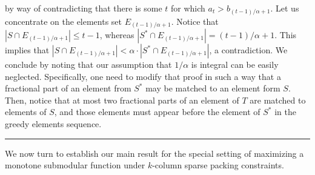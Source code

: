 \documentclass[11pt]{article}
\theoremstyle{plain}
\theoremstyle{definition}
\newcommand{\qedsymb}{\hfill{\rule{2mm}{2mm}}}
\renewenvironment{proof}{\begin{trivlist} \item[\hspace{\labelsep}{\bf \noindent Proof.\/}] }{\qedsymb\end{trivlist}}\newenvironment{proofof}[1]{\begin{trivlist} \item[\hspace{\labelsep}{\bf \noindent Proof of #1.\/}] }{\qedsymb\end{trivlist}}\newenvironment{MyEqn}[1]{\setlength\arraycolsep{2pt}\begin{eqnarray*} #1}{\end{eqnarray*}}
\begin{document}
\begin{proof}
by way of contradicting that there is some $t$ for which $a_t >
b_{(t-1)/\alpha+1}$. Let us concentrate on the elements set
$E_{(t-1)/\alpha+1}$. Notice that $|S \cap E_{(t-1)/\alpha+1}|
\leq t-1$, whereas $|S^* \cap E_{(t-1)/\alpha+1}| =
(t-1)/\alpha+1$. This implies that $|S \cap E_{(t-1)/\alpha+1}| <
\alpha \cdot |S^* \cap E_{(t-1)/\alpha+1}|$, a contradiction. We
conclude by noting that our assumption that $1/\alpha$ is integral
can be easily neglected. Specifically, one need to modify that
proof in such a way that a fractional part of an element from
$S^*$ may be matched to an element form $S$. Then, notice that at
most two fractional parts of an element of $T$ are matched to
elements of $S$, and those elements must appear before the element
of $S^*$ in the greedy elements sequence.~
\end{proof}

We now turn to establish our main result for the special setting
of maximizing a monotone submodular function under $k$-column
sparse packing constraints.
\end{document}
